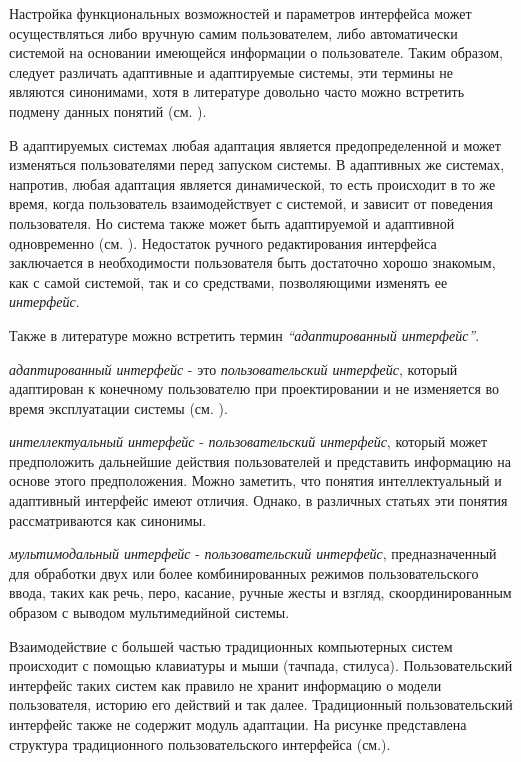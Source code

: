 Настройка функциональных возможностей и параметров интерфейса может осуществляться либо вручную самим пользователем, либо автоматически системой на основании имеющейся информации о пользователе. Таким образом, следует различать адаптивные и адаптируемые системы, эти термины не являются синонимами, хотя в литературе довольно часто можно встретить подмену данных понятий (см. ).

В адаптируемых системах любая адаптация является предопределенной и может изменяться пользователями перед запуском системы. В адаптивных же системах, напротив, любая адаптация является динамической, то есть происходит в то же время, когда пользователь взаимодействует с системой, и зависит от поведения пользователя. Но система также может быть адаптируемой и адаптивной одновременно (см. ).
Недостаток ручного редактирования интерфейса заключается в необходимости пользователя быть достаточно хорошо знакомым, как с самой системой, так и со средствами, позволяющими изменять ее \textit{интерфейс}.

Также в литературе можно встретить термин \textit{``адаптированный интерфейс''}. 

\textit{адаптированный интерфейс} - это \textit{пользовательский интерфейс}, который адаптирован к конечному пользователю при проектировании и не изменяется во время эксплуатации системы (см. ).

\textit{интеллектуальный интерфейс} - \textit{пользовательский интерфейс}, который может предположить дальнейшие действия пользователей и представить информацию на основе этого предположения. Можно заметить, что понятия интеллектуальный и адаптивный интерфейс имеют отличия. Однако, в различных статьях эти понятия рассматриваются как синонимы.

\textit{мультимодальный интерфейс} - \textit{пользовательский интерфейс}, предназначенный для обработки двух или более комбинированных режимов пользовательского ввода, таких как речь, перо, касание, ручные жесты и взгляд, скоординированным образом с выводом мультимедийной системы.

Взаимодействие с большей частью традиционных компьютерных систем происходит с помощью клавиатуры и мыши (тачпада, стилуса). Пользовательский интерфейс таких систем как правило не хранит информацию о модели пользователя, историю его действий и так далее. Традиционный пользовательский интерфейс также не содержит модуль адаптации. На рисунке  представлена структура традиционного пользовательского интерфейса (см.).

